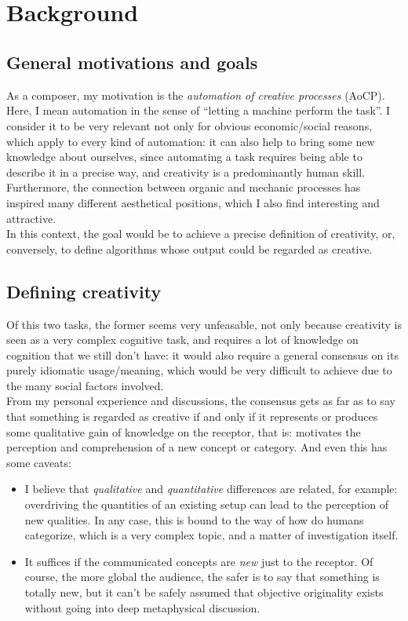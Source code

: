 \documentclass[11pt]{scrartcl} %
\begin{document}
\section*{\\[3mm]Background}
\subsection*{General motivations and goals}
As a composer, my motivation is the {\it automation of creative processes} (AoCP). Here, I mean automation in the sense of ``letting a machine perform the task''. I consider it to be very relevant not only for obvious economic/social reasons, which apply to every kind of automation: it can also help to bring some new knowledge about ourselves, since automating a task requires being able to describe it in a precise way, and creativity is a predominantly human skill. Furthermore, the connection between organic and mechanic processes has inspired many different aesthetical positions, which I also find interesting and attractive.\\[7pt]
In this context, the goal would be to achieve a precise definition of creativity, or, conversely, to define algorithms whose output could be regarded as creative.
\subsection*{Defining creativity}
Of this two tasks, the former seems very unfeasable, not only because creativity is seen as a very complex cognitive task, and requires a lot of knowledge on cognition that we still don't have: it would also require a general consensus on its purely idiomatic usage/meaning, which would be very difficult to achieve due to the many social factors involved.\\[7pt]
From my personal experience and discussions, the consensus gets as far as to say that something is regarded as creative if and only if it represents or produces some qualitative gain of knowledge on the receptor, that is: motivates the perception and comprehension of a new concept or category. And even this has some caveats:
\begin{itemize}
\item I believe that {\it qualitative} and {\it quantitative} differences are related, for example: overdriving the quantities of an existing setup can lead to the perception of new qualities. In any case, this is bound to the way of how do humans categorize, which is a very complex topic, and a matter of investigation itself.
\item It suffices if the communicated concepts are {\it new} just to the receptor. Of course, the more global the audience, the safer is to say that something is totally new, but it can't be safely assumed that objective originality exists without going into deep metaphysical discussion.
\end{itemize}
\end{document}
